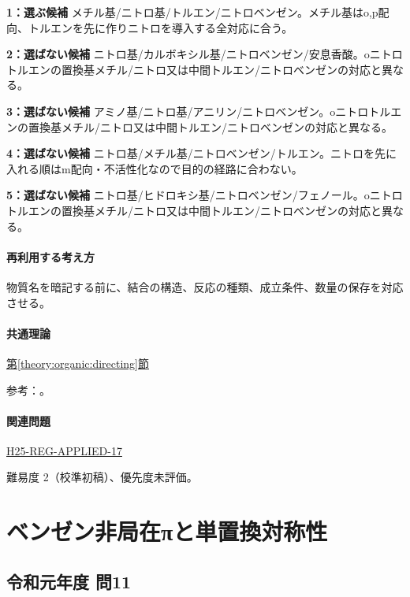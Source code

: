 \noindent\textbf{1：選ぶ候補} メチル基/ニトロ基/トルエン/ニトロベンゼン。メチル基はo,p配向、トルエンを先に作りニトロを導入する全対応に合う。\par

\noindent\textbf{2：選ばない候補} ニトロ基/カルボキシル基/ニトロベンゼン/安息香酸。oニトロトルエンの置換基メチル/ニトロ又は中間トルエン/ニトロベンゼンの対応と異なる。\par

\noindent\textbf{3：選ばない候補} アミノ基/ニトロ基/アニリン/ニトロベンゼン。oニトロトルエンの置換基メチル/ニトロ又は中間トルエン/ニトロベンゼンの対応と異なる。\par

\noindent\textbf{4：選ばない候補} ニトロ基/メチル基/ニトロベンゼン/トルエン。ニトロを先に入れる順はm配向・不活性化なので目的の経路に合わない。\par

\noindent\textbf{5：選ばない候補} ニトロ基/ヒドロキシ基/ニトロベンゼン/フェノール。oニトロトルエンの置換基メチル/ニトロ又は中間トルエン/ニトロベンゼンの対応と異なる。\par

\paragraph{再利用する考え方} 物質名を暗記する前に、結合の構造、反応の種類、成立条件、数量の保存を対応させる。

\paragraph{共通理論} \hyperref[theory:organic:directing]{第\ref*{theory:organic:directing}節}

\par 参考：\cite{organic_directing}。

\paragraph{関連問題} \hyperref[q:h25-reg-applied-17]{H25-REG-APPLIED-17}

\par 難易度 2（校準初稿）、優先度未評価。

\section{ベンゼン非局在πと単置換対称性}

\subsection{令和元年度 問11}
\label{q:r01-reg-applied-11}

